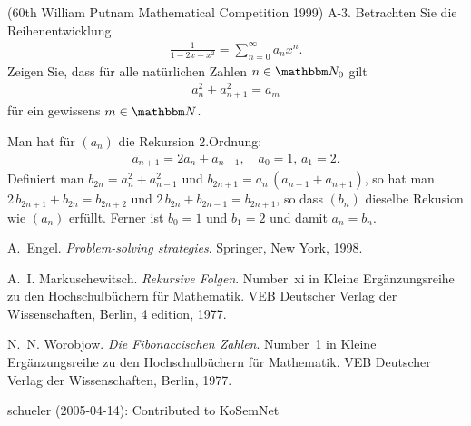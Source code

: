 \documentclass[11pt,a4paper]{article}
\begin{document}
\begin{aufgabe} (60th William Putnam Mathematical Competition 1999)
A-3. Betrachten Sie die Reihenentwicklung
\begin{gather*}
\frac{1}{1-2x -x^2} =\sum_{n=0}^\infty a_n x^n.
\end{gather*}
Zeigen Sie, dass für alle natürlichen Zahlen $n\in\N_0$ gilt
\begin{gather*}
a_n^2 +a_{n+1} ^2 = a_m
\end{gather*}
für ein gewissens $m\in \N $.
\end{aufgabe}

\begin{loesung}
Man hat für $(a_n)$ die Rekursion 2.Ordnung:
\begin{gather*}
a_{n+1} = 2 a_{n} + a_{n-1},\quad a_0=1, \, a_1 = 2.
\end{gather*}
Definiert man $ b_{2n}= a_{n}^2 +a_{n-1}^2 $ und $ b_{2n+1}= a_n\,(a_{n-1}
+a_{n+1})$, so hat man $2\,b_{2n+1} +b_{2n} = b_{2n+2}$ und $2\,b_{2n}+b_{2n-1}
= b_{2n+1} $, so dass $(b_n)$ dieselbe Rekusion wie $(a_n)$ erfüllt. Ferner ist
$b_0=1$ und $b_1=2$ und damit $a_n=b_n$.
\end{loesung}


\begin{thebibliography}{Wor77}

 A.~Engel.  \newblock \emph{Problem-solving
  strategies}.  \newblock Springer, New York, 1998.

 A.~I. Markuschewitsch.  \newblock
  \emph{{R}ekursive {F}olgen}.  \newblock Number~xi in Kleine
  Erg{\"a}nzungsreihe zu den Hochschulb{\"u}chern f{\"u}r Mathematik. VEB
  Deutscher Verlag der Wissenschaften, Berlin, 4 edition, 1977.

 N.~N. Worobjow.  \newblock \emph{Die Fibonaccischen
  Zahlen}.  \newblock Number~1 in Kleine Erg{\"a}nzungsreihe zu den
  Hochschulb{\"u}chern f{\"u}r Mathematik. VEB Deutscher Verlag der
  Wissenschaften, Berlin, 1977.

\end{thebibliography}


\nocite{b-Engel}

%
%
%

\begin{attribution}
schueler (2005-04-14): Contributed to KoSemNet
\end{attribution}

 
\end{document}
